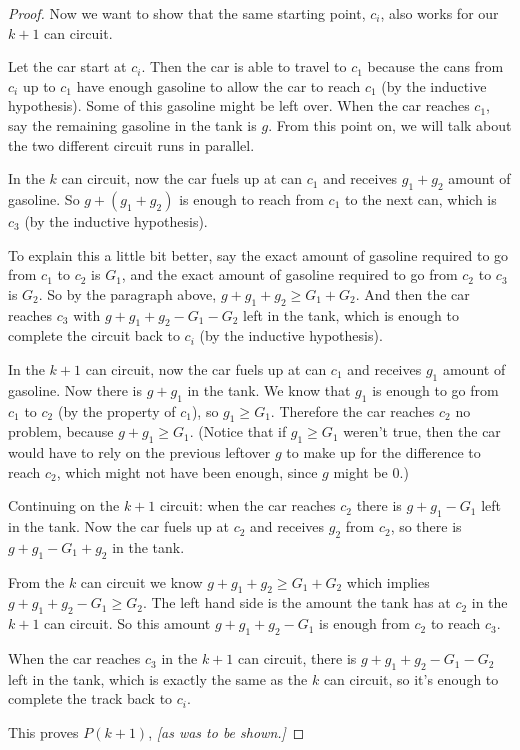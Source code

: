 \documentclass[14pt]{extarticle}
\begin{document}
\begin{proof}
Now we want to show that the same starting point, $c_i$, also works for our $k+1$ can circuit.

Let the car start at $c_i$. Then the car is able to travel to $c_1$ because the cans from $c_i$ up to $c_1$ have enough gasoline to allow the car to reach $c_1$ (by the inductive hypothesis). Some of this gasoline might be left over. When the car reaches $c_1$, say the remaining gasoline in the tank is $g$.  From this point on, we will talk about the two different circuit runs in parallel.

In the $k$ can circuit, now the car fuels up at can $c_1$ and receives $g_1 + g_2$ amount of gasoline. So $g + (g_1 + g_2)$ is enough to reach from $c_1$ to the next can, which is $c_3$ (by the inductive hypothesis). 

To explain this a little bit better, say the exact amount of gasoline required to go from $c_1$ to $c_2$ is $G_1$, and the exact amount of gasoline required to go from $c_2$ to $c_3$ is $G_2$. So by the paragraph above, $g + g_1 + g_2 \geq G_1 + G_2$. And then the car reaches $c_3$ with $g + g_1 + g_2 - G_1 - G_2$ left in the tank, which is enough to complete the circuit back to $c_i$ (by the inductive hypothesis).

In the $k+1$ can circuit, now the car fuels up at can $c_1$ and receives $g_1$ amount of gasoline. Now there is $g + g_1$ in the tank. We know that $g_1$ is enough to go from $c_1$ to $c_2$ (by the property of $c_1$), so $g_1 \geq G_1$. Therefore the car reaches $c_2$ no problem, because $g + g_1 \geq G_1$. (Notice that if $g_1 \geq G_1$ weren't true, then the car would have to rely on the previous leftover $g$ to make up for the difference to reach $c_2$, which might not have been enough, since $g$ might be 0.)

Continuing on the $k+1$ circuit: when the car reaches $c_2$ there is $g + g_1 - G_1$ left in the tank. Now the car fuels up at $c_2$ and receives $g_2$ from $c_2$, so there is $g + g_1 - G_1 + g_2$ in the tank.

From the $k$ can circuit we know $g + g_1 + g_2 \geq G_1 + G_2$ which implies $g + g_1 + g_2 - G_1 \geq G_2$. The left hand side is the amount the tank has at $c_2$ in the $k+1$ can circuit. So this amount $g + g_1 + g_2 - G_1$ is enough from $c_2$ to reach $c_3$. 

When the car reaches $c_3$ in the $k+1$ can circuit, there is $g + g_1 + g_2 - G_1 - G_2$ left in the tank, which is exactly the same as the $k$ can circuit, so it's enough to complete the track back to $c_i$.

This proves $P(k+1)$, {\it [as was to be shown.]}
\end{proof}
\end{document}
